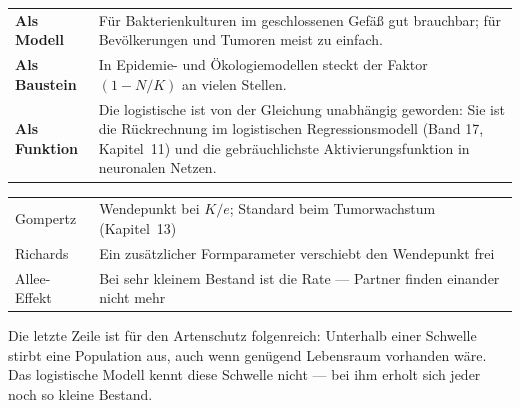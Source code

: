 \begin{forschung}
\begin{center}
{\small
\renewcommand{\arraystretch}{1.45}
\begin{tabular}{@{}P{2.8cm}P{5.4cm}@{}}
\toprule
\textbf{Als Modell} & Für Bakterienkulturen im geschlossenen Gefäß gut brauchbar; für Bevölkerungen und Tumoren meist zu einfach.\\
\textbf{Als Baustein} & In Epidemie- und Ökologiemodellen steckt der Faktor $(1-N/K)$ an vielen Stellen.\\
\textbf{Als Funktion} & Die logistische  ist von der Gleichung unabhängig geworden: Sie ist die Rückrechnung im logistischen Regressionsmodell (Band 17, Kapitel~11) und die gebräuchlichste Aktivierungsfunktion in neuronalen Netzen.\\
\bottomrule
\end{tabular}}
\end{center}

\begin{center}
\begin{minipage}{0.88\textwidth}
\end{minipage}
\end{center}

\begin{center}
{\small
\renewcommand{\arraystretch}{1.45}
\begin{tabular}{@{}P{2.4cm}P{5.8cm}@{}}
\toprule
Gompertz & Wendepunkt bei $K/e$; Standard beim Tumorwachstum (Kapitel~13)\\
Richards & Ein zusätzlicher Formparameter verschiebt den Wendepunkt frei\\
Allee-Effekt & Bei sehr kleinem Bestand ist die Rate  --- Partner finden einander nicht mehr\\
\bottomrule
\end{tabular}}
\end{center}

Die letzte Zeile ist für den Artenschutz folgenreich: Unterhalb einer Schwelle stirbt eine Population aus, auch wenn genügend Lebensraum vorhanden wäre. Das logistische Modell kennt diese Schwelle nicht --- bei ihm erholt sich jeder noch so kleine Bestand.
\end{forschung}


